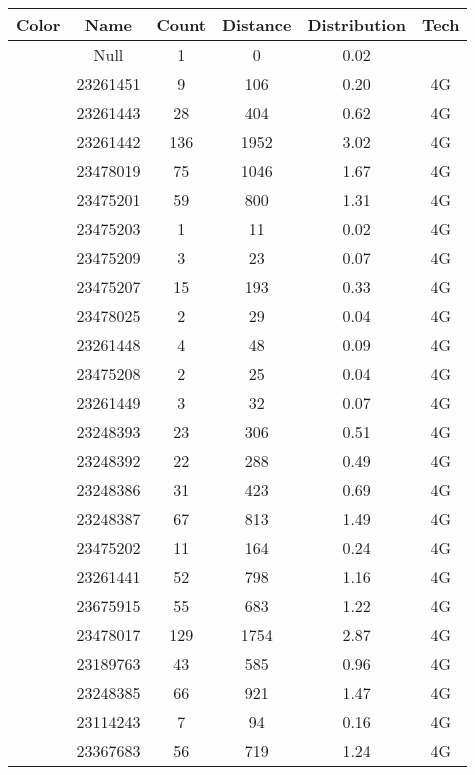 \begin{longtable*}{|c|c|c|c|c|c|}\hline
{}
Color&Name&Count&Distance&Distribution&Tech\\\hline\hline
{} &Null&1&0&0.02&\\\hline
{} &23261451&9&106&0.20&4G\\\hline
{} &23261443&28&404&0.62&4G\\\hline
{} &23261442&136&1952&3.02&4G\\\hline
{} &23478019&75&1046&1.67&4G\\\hline
{} &23475201&59&800&1.31&4G\\\hline
{} &23475203&1&11&0.02&4G\\\hline
{} &23475209&3&23&0.07&4G\\\hline
{} &23475207&15&193&0.33&4G\\\hline
{} &23478025&2&29&0.04&4G\\\hline
{} &23261448&4&48&0.09&4G\\\hline
{} &23475208&2&25&0.04&4G\\\hline
{} &23261449&3&32&0.07&4G\\\hline
{} &23248393&23&306&0.51&4G\\\hline
{} &23248392&22&288&0.49&4G\\\hline
{} &23248386&31&423&0.69&4G\\\hline
{} &23248387&67&813&1.49&4G\\\hline
{} &23475202&11&164&0.24&4G\\\hline
{} &23261441&52&798&1.16&4G\\\hline
{} &23675915&55&683&1.22&4G\\\hline
{} &23478017&129&1754&2.87&4G\\\hline
{} &23189763&43&585&0.96&4G\\\hline
{} &23248385&66&921&1.47&4G\\\hline
{} &23114243&7&94&0.16&4G\\\hline
{} &23367683&56&719&1.24&4G\\\hline

\end{longtable*}

